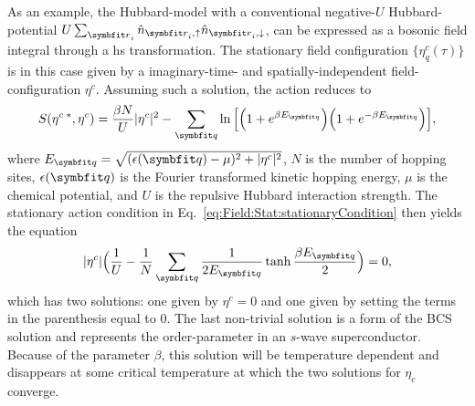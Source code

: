 As an example, the Hubbard-model with a conventional negative-$U$ Hubbard-potential $U\sum_{\v{r}_i}\hat{n}_{\v{r}_i,\up}\hat{n}_{\v{r}_i,\dn}$,
can be expressed as a bosonic field integral through a \ac{hs} transformation.
The stationary field configuration $\{\eta^c_q(\tau)\}$ is in this case given by a imaginary-time- and spatially-independent
field-configuration $\eta^c$. Assuming such a solution, the action reduces to
\begin{equation}
    \label{eq:Field:Stat:meanFieldHubbard}
    S(\eta^{c\;\ast}, \eta^c) = \frac{\beta N}{U}|\eta^c|^2 - \sum_\v{q}\ln\Big[\Big(1+e^{\beta E_\v{q}}\Big)\Big(1+e^{-\beta E_\v{q}}\Big)\Big],
\end{equation}
where $E_\v{q} = \sqrt{(\epsilon(\v{q})-\mu)^2 + |\eta^c|^2}$, $N$ is the number of hopping sites, $\epsilon(\v{q})$ is the Fourier transformed
kinetic hopping energy, $\mu$ is the chemical potential, and $U$ is the repulsive Hubbard interaction strength. The stationary action condition
in Eq.~\eqref{eq:Field:Stat:stationaryCondition} then yields the equation
\begin{equation}
    \label{eq:Field:Stat:hubbardStationary}
    |\eta^c|\Big(\frac{1}{U} - \frac{1}{N}\sum_\v{q}\frac{1}{2E_\v{q}}\tanh\frac{\beta E_\v{q}}{2}\Big) = 0,
\end{equation}
which has two solutions: one given by $\eta^c = 0$ and one given by setting the terms in the parenthesis equal to $0$. The last non-trivial solution
is a form of the BCS solution and represents the order-parameter in an $s$-wave superconductor. Because of the parameter $\beta$, this
solution will be temperature dependent and disappears at some critical temperature at which the two solutions for $\eta_c$ converge.

